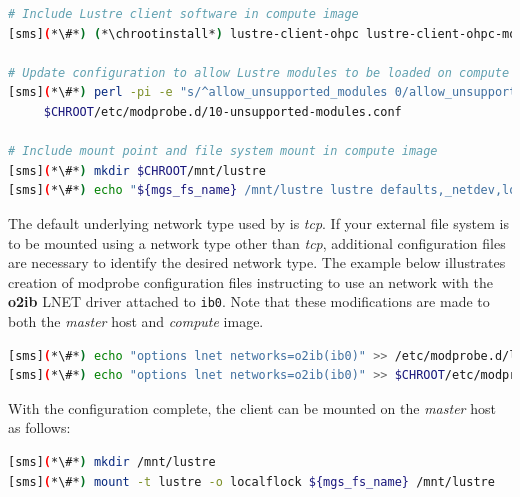 \documentclass[letterpaper]{article}
\newcommand{\chrootinstall}{zypper -n --root \$CHROOT install}
\begin{document}
\clearpage
\begin{lstlisting}[language=bash,keywords={},upquote=true]
# Include Lustre client software in compute image
[sms](*\#*) (*\chrootinstall*) lustre-client-ohpc lustre-client-ohpc-modules

# Update configuration to allow Lustre modules to be loaded on compute hosts
[sms](*\#*) perl -pi -e "s/^allow_unsupported_modules 0/allow_unsupported_modules 1/" \
     $CHROOT/etc/modprobe.d/10-unsupported-modules.conf

# Include mount point and file system mount in compute image
[sms](*\#*) mkdir $CHROOT/mnt/lustre
[sms](*\#*) echo "${mgs_fs_name} /mnt/lustre lustre defaults,_netdev,localflock 0 0" >> $CHROOT/etc/fstab
\end{lstlisting}



The default underlying network type used by \Lustre{} is {\em tcp}. If your
external \Lustre{} file system is to be mounted using a network type other than
{\em tcp}, additional configuration files are necessary to identify the desired
network type. The example below illustrates creation of modprobe configuration files
instructing \Lustre{} to use an \InfiniBand{} network with the \textbf{o2ib} LNET driver
attached to \texttt{ib0}. Note that these modifications are made to both the
{\em master} host and {\em compute} image.

\begin{lstlisting}[language=bash,keywords={},upquote=true]
[sms](*\#*) echo "options lnet networks=o2ib(ib0)" >> /etc/modprobe.d/lustre.conf
[sms](*\#*) echo "options lnet networks=o2ib(ib0)" >> $CHROOT/etc/modprobe.d/lustre.conf
\end{lstlisting}

With the \Lustre{} configuration complete, the client can be mounted on the {\em master}
host as follows:
\begin{lstlisting}[language=bash,keywords={},upquote=true]
[sms](*\#*) mkdir /mnt/lustre
[sms](*\#*) mount -t lustre -o localflock ${mgs_fs_name} /mnt/lustre
\end{lstlisting}

\end{document}
